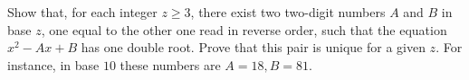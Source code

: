 Show that, for each integer $z \ge 3$, there exist two two-digit numbers $A$ and $B$ in base $z$, one equal to the other one read in reverse order, such that the equation $x^2 -Ax+B$ has one double root. Prove that this pair is unique for a given $z$. For instance, in base $10$ these numbers are $A = 18, B = 81$.